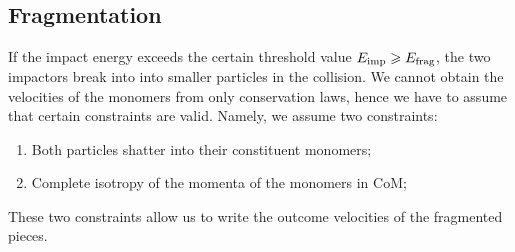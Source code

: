 \documentclass[aps,prl,preprint,groupedaddress,10pt]{revtex4-2}
\begin{document}
\subsection{Fragmentation}
If the impact energy exceeds the certain threshold value 
$E_{\mathrm{imp}}\geqslant E_{\mathrm{frag}}$, the two impactors break into into smaller
particles in the collision.
We cannot obtain the velocities of the monomers from only conservation laws, hence 
we have to assume that certain constraints are valid. Namely, we assume two 
constraints:
\begin{enumerate}
    \item Both particles shatter into their constituent monomers;
    \item Complete isotropy of the momenta of the monomers in CoM;
\end{enumerate}
These two constraints allow us to write the outcome velocities of the fragmented pieces.




    
\end{document}
